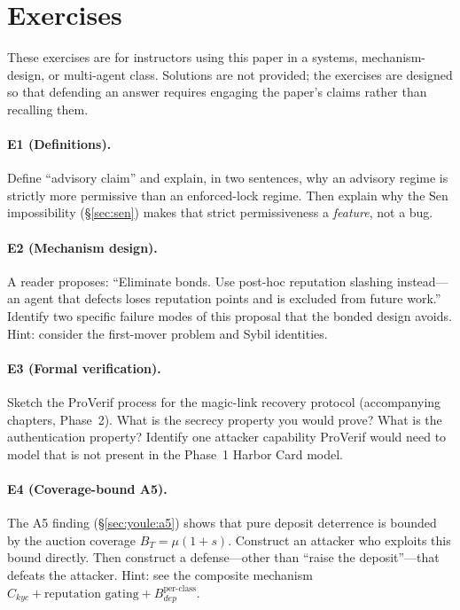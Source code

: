\documentclass[11pt,a4paper]{article}
\theoremstyle{definition}
\theoremstyle{remark}
\begin{document}
\section{Exercises}\label{app:exercises}

These exercises are for instructors using this paper in a systems, mechanism-design, or multi-agent class. Solutions are not provided; the exercises are designed so that defending an answer requires engaging the paper's claims rather than recalling them.

\paragraph{E1 (Definitions).} Define ``advisory claim'' and explain, in two sentences, why an advisory regime is strictly more permissive than an enforced-lock regime. Then explain why the Sen impossibility (\S\ref{sec:sen}) makes that strict permissiveness a \emph{feature}, not a bug.

\paragraph{E2 (Mechanism design).} A reader proposes: ``Eliminate bonds. Use post-hoc reputation slashing instead---an agent that defects loses reputation points and is excluded from future work.'' Identify two specific failure modes of this proposal that the bonded design avoids. Hint: consider the first-mover problem and Sybil identities.

\paragraph{E3 (Formal verification).} Sketch the ProVerif process for the magic-link recovery protocol (accompanying chapters, Phase~2). What is the secrecy property you would prove? What is the authentication property? Identify one attacker capability ProVerif would need to model that is not present in the Phase~1 Harbor Card model.

\paragraph{E4 (Coverage-bound A5).} The A5 finding (\S\ref{sec:youle:a5}) shows that pure deposit deterrence is bounded by the auction coverage $B_T = \mu(1+s)$. Construct an attacker who exploits this bound directly. Then construct a defense---other than ``raise the deposit''---that defeats the attacker. Hint: see the composite mechanism $C_{kyc} + \text{reputation gating} + B_{dep}^{\text{per-class}}$.
\end{document}
